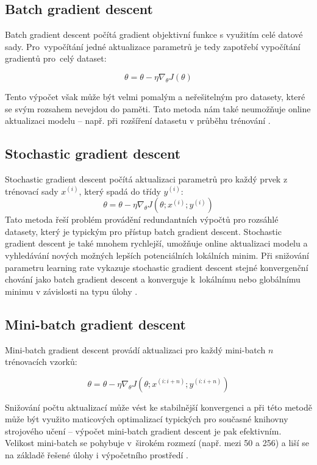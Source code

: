 \subsection{Batch gradient descent}
Batch gradient descent počítá gradient objektivní funkce s využitím celé datové sady. Pro~vypočítání jedné aktualizace parametrů je tedy zapotřebí vypočítání gradientů pro~celý dataset: 

  \begin{equation} 
    \theta = \theta - \eta\nabla_{\theta}J(\theta)
    \end{equation} 

Tento výpočet však může být velmi pomalým a neřešitelným pro datasety, které se svým rozsahem nevejdou do paměti. Tato metoda nám také neumožňuje online aktualizaci modelu -- např. při rozšíření datasetu v průběhu trénování \cite{GradientDescent}.

\subsection{Stochastic gradient descent}
Stochastic gradient descent počítá aktualizaci parametrů pro každý prvek z trénovací sady $x^{(i)}$, který spadá do třídy $y^{(i)}$:
  \begin{equation} 
    \theta = \theta - \eta\nabla_{\theta}J(\theta;x^{(i)};y^{(i)})
    \end{equation} 
Tato metoda řeší problém provádění redundantních výpočtů pro rozsáhlé datasety, který je typickým pro přístup batch gradient descent. Stochastic gradient descent je také mnohem rychlejší, umožňuje online aktualizaci modelu a vyhledávání nových možných lepších potenciálních lokálních minim. Při snižování parametru learning rate vykazuje stochastic gradient descent stejné konvergenční chování jako batch gradient descent a konverguje k~lokálnímu nebo globálnímu minimu v závislosti na typu úlohy \cite{GradientDescent}.

\subsection{Mini-batch gradient descent}
Mini-batch gradient descent provádí aktualizaci pro každý mini-batch $n$ trénovacích vzorků: 

\begin{equation} 
    \theta = \theta - \eta\nabla_{\theta}J(\theta;x^{(i:i+n)};y^{(i:i+n)})
    \end{equation} 

Snižování počtu aktualizací může vést ke stabilnější konvergenci a při této metodě může být využito maticových optimalizací typických pro současné knihovny strojového učení -- výpočet mini-batch gradient descent je pak efektivním. Velikost mini-batch se pohybuje v~širokém rozmezí (např. mezi 50 a 256) a liší se na základě řešené úlohy i výpočetního prostředí \cite{GradientDescent}. 



